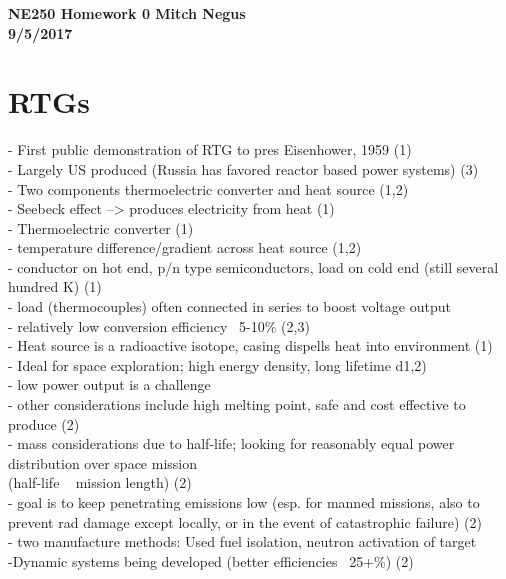 \documentclass{report}
\begin{document}
\thispagestyle{empty}

{\bf {\large {NE250 Homework {0} \hfill Mitch Negus\\
		\hspace*{\fill} 9/5/2017\\ }}}
\section*{RTGs}


- First public demonstration of RTG to pres Eisenhower, 1959 (1)\\
- Largely US produced (Russia has favored reactor based power systems) (3)\\
- Two components thermoelectric converter and heat source (1,2)\\
- Seebeck effect --> produces electricity from heat (1)\\
- Thermoelectric converter (1)\\
	-  temperature difference/gradient across heat source (1,2)\\
	-  conductor on hot end, p/n type semiconductors, load on cold end (still several hundred K) (1)\\
	- load (thermocouples) often connected in series to boost voltage output\\
	- relatively low conversion efficiency ~5-10\% (2,3)\\
- Heat source is a radioactive isotope, casing dispells heat into environment (1)\\
- Ideal for space exploration; high energy density, long lifetime d1,2)\\
- low power output is a challenge\\
- other considerations include high melting point, safe and cost effective to produce (2)\\
- mass considerations due to half-life; looking for reasonably equal power distribution over space mission \\(half-life ~ mission length) (2)\\
- goal is to keep penetrating emissions low (esp. for manned missions, also to prevent rad damage except locally, or in the event of catastrophic failure) (2)\\
- two manufacture methods: Used fuel isolation, neutron activation of target\\

-Dynamic systems being developed (better efficiencies ~25+\%) (2)\\
\end{document}
